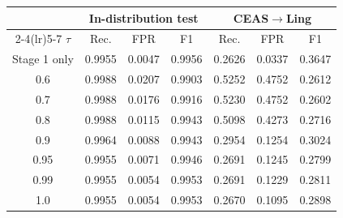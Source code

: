 \begin{tabular}{ccccccc}
\toprule
 & \multicolumn{3}{c}{In-distribution test} & \multicolumn{3}{c}{CEAS$\rightarrow$Ling}\\
\cmidrule(lr){2-4}\cmidrule(lr){5-7}
$\tau$ & Rec. & FPR & F1 & Rec. & FPR & F1\\
\midrule
Stage 1 only & 0.9955 & 0.0047 & 0.9956 & 0.2626 & 0.0337 & 0.3647\\
0.6 & 0.9988 & 0.0207 & 0.9903 & 0.5252 & 0.4752 & 0.2612\\
0.7 & 0.9988 & 0.0176 & 0.9916 & 0.5230 & 0.4752 & 0.2602\\
0.8 & 0.9988 & 0.0115 & 0.9943 & 0.5098 & 0.4273 & 0.2716\\
0.9 & 0.9964 & 0.0088 & 0.9943 & 0.2954 & 0.1254 & 0.3024\\
0.95 & 0.9955 & 0.0071 & 0.9946 & 0.2691 & 0.1245 & 0.2799\\
0.99 & 0.9955 & 0.0054 & 0.9953 & 0.2691 & 0.1229 & 0.2811\\
1.0 & 0.9955 & 0.0054 & 0.9953 & 0.2670 & 0.1095 & 0.2898\\
\bottomrule
\end{tabular}
